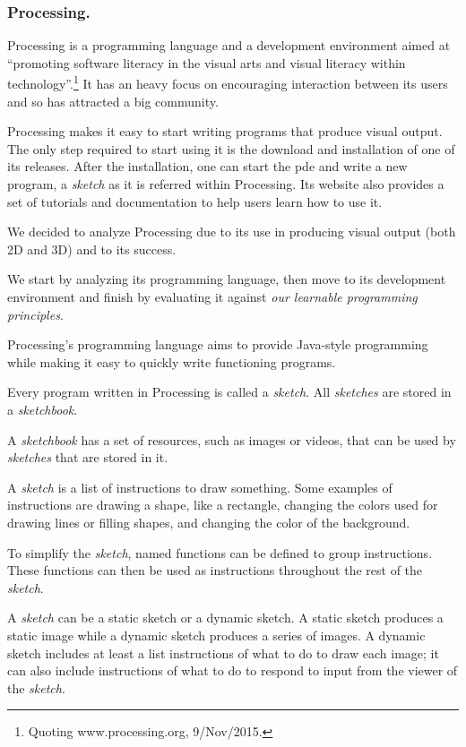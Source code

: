 \documentclass{./llncs2e/llncs}
\begin{document}
	
\subsubsection{Processing.}
	Processing\cite{reas2007processing} is a programming language and a development environment aimed at ``promoting software literacy in the visual arts and visual literacy within technology''.\footnote{Quoting www.processing.org, 9/Nov/2015.}
	It has an heavy focus on encouraging interaction between its users and so has attracted a big community.
	
	Processing makes it easy to start writing programs that produce visual output. 
	The only step required to start using it is the download and installation of one of its releases. 
	After the installation, one can start the \ac{pde} and write a new program, a \emph{sketch} as it is referred within Processing. 
	Its website also provides a set of tutorials and documentation to help users learn how to use it.
	
	We decided to analyze Processing due to its use in producing visual output (both 2D and 3D) and to its success.
	
	We start by analyzing its programming language, then move to its development environment and finish by evaluating it against \emph{our learnable programming principles}.
	
	Processing's programming language aims to provide Java-style programming while making it easy to quickly write functioning programs. 
	
	Every program written in Processing is called a \emph{sketch}. 
	All \emph{sketches} are stored in a \emph{sketchbook}.
	
	A \emph{sketchbook} has a set of resources, such as images or videos, that can be used by \emph{sketches} that are stored in it.
	
	A \emph{sketch} is a list of instructions to draw something. 
	Some examples of instructions are drawing a shape, like a rectangle, changing the colors used for drawing lines or filling shapes, and changing the color of the background.
	
	To simplify the \emph{sketch}, named functions can be defined to group instructions. 
	These functions can then be used as instructions throughout the rest of the \emph{sketch}.
	
	A \emph{sketch} can be a static sketch or a dynamic sketch. 
	A static sketch produces a static image while a dynamic sketch produces a series of images. 
	A dynamic sketch includes at least a list instructions of what to do to draw each image; it can also include instructions of what to do to respond to input from the viewer of the \emph{sketch}.
	
\end{document}
